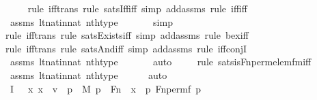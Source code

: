 \begin{isabellebody}
\ \ \ \ \isamarkupfalse%
{\isacharparenleft}{\kern0pt}rule\ iff{\isacharunderscore}{\kern0pt}trans{\isacharcomma}{\kern0pt}\ rule\ sats{\isacharunderscore}{\kern0pt}Iff{\isacharunderscore}{\kern0pt}iff{\isacharcomma}{\kern0pt}\ simp\ add{\isacharcolon}{\kern0pt}assms{\isacharcomma}{\kern0pt}\ rule\ iff{\isacharunderscore}{\kern0pt}iff{\isacharparenright}{\kern0pt}\isanewline
\ \ \ \ \isamarkupfalse%
\ assms\ lt{\isacharunderscore}{\kern0pt}nat{\isacharunderscore}{\kern0pt}in{\isacharunderscore}{\kern0pt}nat\ nth{\isacharunderscore}{\kern0pt}type\isanewline
\ \ \ \ \ \isamarkupfalse%
\ simp\isanewline
\ \ \ \ \isamarkupfalse%
{\isacharparenleft}{\kern0pt}rule\ iff{\isacharunderscore}{\kern0pt}trans{\isacharcomma}{\kern0pt}\ rule\ sats{\isacharunderscore}{\kern0pt}Exists{\isacharunderscore}{\kern0pt}iff{\isacharcomma}{\kern0pt}\ simp\ add{\isacharcolon}{\kern0pt}assms{\isacharcomma}{\kern0pt}\ rule\ bex{\isacharunderscore}{\kern0pt}iff{\isacharparenright}{\kern0pt}\isanewline
\ \ \ \ \isamarkupfalse%
{\isacharparenleft}{\kern0pt}rule\ iff{\isacharunderscore}{\kern0pt}trans{\isacharcomma}{\kern0pt}\ rule\ sats{\isacharunderscore}{\kern0pt}And{\isacharunderscore}{\kern0pt}iff{\isacharcomma}{\kern0pt}\ simp\ add{\isacharcolon}{\kern0pt}assms{\isacharcomma}{\kern0pt}\ rule\ iff{\isacharunderscore}{\kern0pt}conjI{}{\isacharparenright}{\kern0pt}\isanewline
\ \ \ \ \isamarkupfalse%
\ assms\ lt{\isacharunderscore}{\kern0pt}nat{\isacharunderscore}{\kern0pt}in{\isacharunderscore}{\kern0pt}nat\ nth{\isacharunderscore}{\kern0pt}type\isanewline
\ \ \ \ \ \isamarkupfalse%
\ auto{\isacharbrackleft}{\kern0pt}{}{\isacharbrackright}{\kern0pt}\isanewline
\ \ \ \ \isamarkupfalse%
{\isacharparenleft}{\kern0pt}rule\ sats{\isacharunderscore}{\kern0pt}is{\isacharunderscore}{\kern0pt}Fn{\isacharunderscore}{\kern0pt}perm{\isacharprime}{\kern0pt}{\isacharunderscore}{\kern0pt}elem{\isacharunderscore}{\kern0pt}fm{\isacharunderscore}{\kern0pt}iff{\isacharparenright}{\kern0pt}\isanewline
\ \ \ \ \isamarkupfalse%
\ assms\ lt{\isacharunderscore}{\kern0pt}nat{\isacharunderscore}{\kern0pt}in{\isacharunderscore}{\kern0pt}nat\ nth{\isacharunderscore}{\kern0pt}type\isanewline
\ \ \ \ \isamarkupfalse%
\ auto\isanewline
\ \ \isamarkupfalse%
\ I{}{\isacharcolon}{\kern0pt}\ {\isachardoublequoteopen}{\isachardot}{\kern0pt}{\isachardot}{\kern0pt}{\isachardot}{\kern0pt}\ {\isasymlongleftrightarrow}\ {\isacharparenleft}{\kern0pt}{\isasymforall}x{\isachardot}{\kern0pt}\ x\ {\isasymin}\ v\ {\isasymlongleftrightarrow}\ {\isacharparenleft}{\kern0pt}{\isasymexists}p\ {\isasymin}\ M{\isachardot}{\kern0pt}\ p\ {\isasymin}\ Fn\ {\isasymand}\ x\ {\isacharequal}{\kern0pt}\ {\isacharless}{\kern0pt}p{\isacharcomma}{\kern0pt}\ Fn{\isacharunderscore}{\kern0pt}perm{\isacharparenleft}{\kern0pt}f{\isacharcomma}{\kern0pt}\ p{\isacharparenright}{\kern0pt}{\isachargreater}{\kern0pt}{\isacharparenright}{\kern0pt}{\isacharparenright}{\kern0pt}{\isachardoublequoteclose}\ \isanewline

\end{isabellebody}
